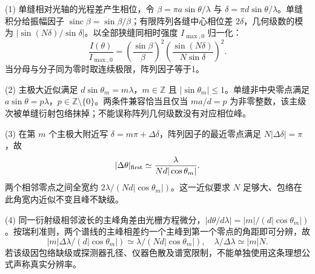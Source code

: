 (1) 单缝相对光轴的光程差产生相位，令 \(\beta=\pi a\sin\theta/\lambda\) 与 \(\delta=\pi d\sin\theta/\lambda\)。单缝积分给振幅因子 \(\operatorname{sinc}\beta=\sin\beta/\beta\)；有限阵列各缝中心相位差 \(2\delta\)，几何级数的模为 \(|\sin(N\delta)/\sin\delta|\)。以全部狭缝同相时强度 \(I_{\max,0}\) 归一化：
\[
\frac{I(\theta)}{I_{\max,0}}=
\left(\frac{\sin\beta}{\beta}\right)^2
\left(\frac{\sin(N\delta)}{N\sin\delta}\right)^2.
\]
当分母与分子同为零时取连续极限，阵列因子等于1。

(2) 主极大近似满足 \(d\sin\theta_m=m\lambda\)，\(m\in\mathbb Z\) 且 \(|\sin\theta_m|\le1\)。单缝非中央零点满足 \(a\sin\theta=p\lambda\)，\(p\in\mathbb Z\setminus\{0\}\)。两条件兼容恰当且仅当 \(ma/d=p\) 为非零整数，该主级次被单缝衍射包络抹掉；不能误称阵列几何级数没有对应相位峰。

(3) 在第 \(m\) 个主极大附近写 \(\delta=m\pi+\Delta\delta\)，阵列因子的最近零点满足 \(N|\Delta\delta|=\pi\)，故
\[
|\Delta\theta|_{\rm first}\simeq\frac{\lambda}{Nd|\cos\theta_m|}.
\]
两个相邻零点之间全宽约 \(2\lambda/(Nd|\cos\theta_m|)\)。这一近似要求 \(N\) 足够大、包络在此角宽内近似不变且峰不缺级。

(4) 同一衍射级相邻波长的主峰角差由光栅方程微分，\(|d\theta/d\lambda|=|m|/(d|\cos\theta_m|)\)。按瑞利准则，两个谱线的主峰相差约一个主峰到第一个零点的角距即可分辨，故
\[
|m|\Delta\lambda/(d|\cos\theta_m|)\simeq\lambda/(Nd|\cos\theta_m|),
\quad \lambda/\Delta\lambda\simeq|m|N.
\]
若该级因包络缺级或探测器孔径、仪器色散及谱宽限制，不能单独使用这条理想公式声称真实分辨率。
